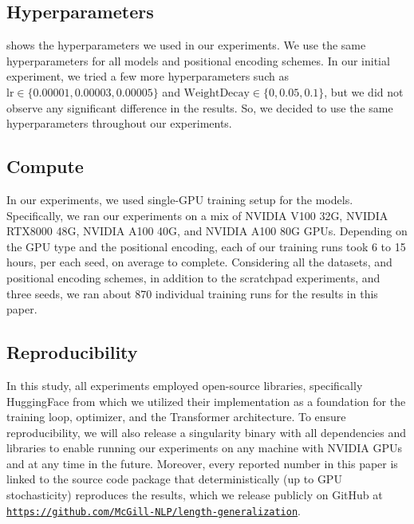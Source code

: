 \documentclass{article}
\begin{document}
\subsection{Hyperparameters}
\label{sec:exp-details-hparams}

 shows the hyperparameters we used in our experiments. We use the same hyperparameters for all models and positional encoding schemes. In our initial experiment, we tried a few more hyperparameters such as $\mathrm{lr} \in \{0.00001, 0.00003, 0.00005\}$ and $\mathrm{WeightDecay} \in \{0, 0.05, 0.1\}$, but we did not observe any significant difference in the results. So, we decided to use the same hyperparameters throughout our experiments.

\subsection{Compute}
\label{sec:exp-details-compute}
In our experiments, we used single-GPU training setup for the models. Specifically, we ran our experiments on a mix of NVIDIA V100 32G, NVIDIA RTX8000 48G, NVIDIA A100 40G, and NVIDIA A100 80G GPUs. Depending on the GPU type and the positional encoding, each of our training runs took 6 to 15 hours, per each seed, on average to complete.
Considering all the datasets, and positional encoding schemes, in addition to the scratchpad experiments, and three seeds, we ran about 870 individual training runs for the results in this paper.

\subsection{Reproducibility}
\label{sec:exp-details-reproducibility}
In this study, all experiments employed open-source libraries, specifically HuggingFace \citep{Wolf2020:Huggingface} from which we utilized their implementation as a foundation for the training loop, optimizer, and the Transformer architecture.
To ensure reproducibility, we will also release a singularity binary with all dependencies and libraries to enable running our experiments on any machine with NVIDIA GPUs and at any time in the future. Moreover, every reported number in this paper is linked to the source code package that deterministically (up to GPU stochasticity) reproduces the results, which we release publicly on GitHub at 
\href{https://github.com/McGill-NLP/length-generalization}{\texttt{https://github.com/McGill-NLP/length-generalization}}.

\end{document}

